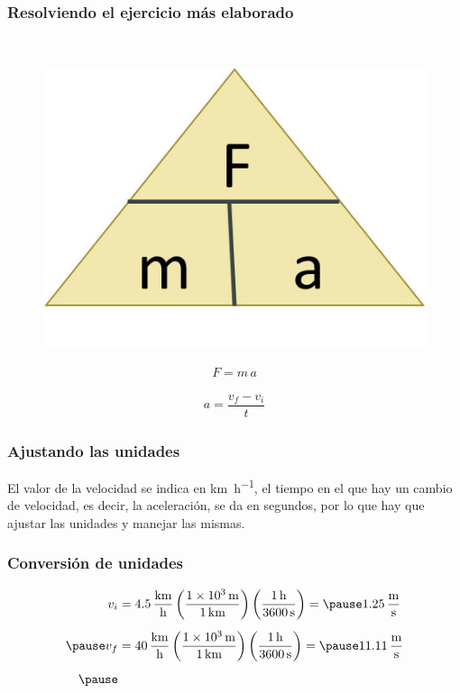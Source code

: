 \documentclass[14pt]{beamer}
\begin{document}
\begin{frame}
\frametitle{Resolviendo el ejercicio más elaborado}
\\
\begin{minipage}{0.4\linewidth}
\begin{figure}
    \centering
    \includegraphics[scale=0.75]{Imagenes/Newton_11.jpg}
\end{figure}
\end{minipage}
\begin{minipage}{0.4\linewidth}
\begin{align*}
F = m \, a
\end{align*}
\end{minipage}
\pause
\begin{align*}
a = \dfrac{v_{f} - v_{i}}{t}
\end{align*}
\end{frame}
\begin{frame}
\frametitle{Ajustando las unidades}
El valor de la velocidad se indica en \unit{\kilo\meter\per\hour}, el tiempo en el que hay un cambio de velocidad, es decir, la aceleración, se da en segundos, por lo que hay que ajustar las unidades y manejar las mismas.
\end{frame}
\begin{frame}
\frametitle{Conversión de unidades}
\begin{eqnarray*}
\begin{aligned}
v_{i} &= \SI[per-mode=fraction]{4.5}{\kilo\meter\per\hour} \left( \dfrac{\SI{1d3}{\meter}}{\SI{1}{\kilo\meter}} \right) \left( \dfrac{\SI{1}{\hour}}{\SI{3600}{\second}} \right) = \pause \SI[per-mode=fraction]{1.25}{\meter\per\second} \\[0.5em] \pause
v_{f} &= \SI[per-mode=fraction]{40}{\kilo\meter\per\hour} \left( \dfrac{\SI{1d3}{\meter}}{\SI{1}{\kilo\meter}} \right) \left( \dfrac{\SI{1}{\hour}}{\SI{3600}{\second}} \right) = \pause \SI[per-mode=fraction]{11.11}{\meter\per\second} \\[0.5em] \pause
\end{aligned}
\end{eqnarray*}
\end{frame}
\end{document}
